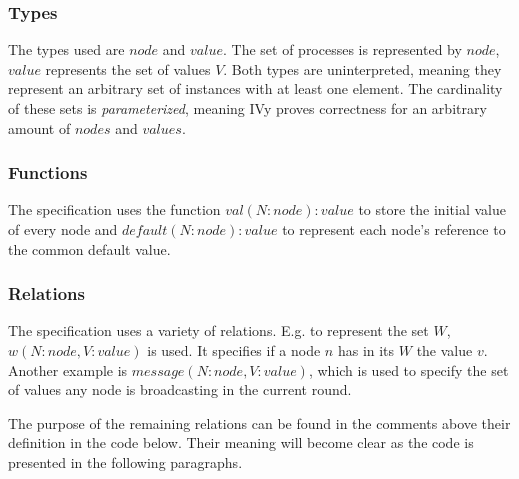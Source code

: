 \documentclass[fleqn]{article}
\begin{document}
\subsubsection{Types}
The types used are $node$ and $value$. The set of processes is represented by $node$, $value$ represents the set of values $V$. Both types are uninterpreted, meaning they represent an arbitrary set of instances with at least one element.  The cardinality of these sets is \textit{parameterized}, meaning IVy proves correctness for an arbitrary amount of $nodes$ and $values$.


\subsubsection{Functions}
The specification uses the function $val(N:node) : value$ to store the initial value of every node and $default(N:node) : value$ to represent each node's reference to the common default value.

\subsubsection{Relations}
The specification uses a variety of relations. E.g. to represent the set $W$, $w(N:node,V:value)$ is used. It specifies if a node $n$ has in its $W$ the value $v$. Another example is $message(N:node,V:value)$, which is used to specify the set of values any node is broadcasting in the current round.

The purpose of the remaining relations can be found in the comments above their definition in the code below. Their meaning will become clear as the code is presented in the following paragraphs.
\end{document}
